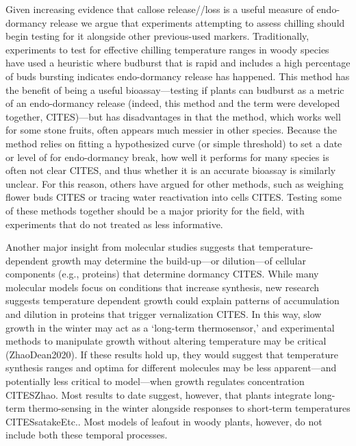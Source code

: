 \documentclass[11pt]{article}
\begin{document}
Given increasing evidence that callose release//loss is a useful measure of endo-dormancy release we argue that experiments attempting to assess chilling should begin testing for it alongside other previous-used markers. Traditionally, experiments to test for effective chilling temperature ranges in woody species have used a heuristic where budburst that is rapid and includes a high percentage of buds bursting indicates endo-dormancy release has happened. This method has the benefit of being a useful bioassay---testing if plants can budburst as a metric of an endo-dormancy release (indeed, this method and the term were developed together, CITES)---but has disadvantages in that the method, which works well for some stone fruits, often appears much messier in other species. Because the method relies on fitting a hypothesized curve (or simple threshold) to set a date or level of for endo-dormancy break, how well it performs for many species is often not clear CITES, and thus whether it is an accurate bioassay is similarly unclear. For this reason, others have argued for other methods, such as weighing flower buds CITES or tracing water reactivation into cells CITES. Testing some of these methods together should be a major priority for the field, with experiments that do not treated as less informative. 

Another major insight from molecular studies suggests that temperature-dependent growth may determine the build-up---or dilution---of cellular components (e.g., proteins) that determine dormancy CITES. While many molecular models focus on conditions that increase synthesis, new research suggests temperature dependent growth could explain patterns of accumulation and dilution in proteins that trigger vernalization CITES. In this way, slow growth in the winter may act as a `long-term thermosensor,' and experimental methods to manipulate growth without altering temperature may be critical (ZhaoDean2020). If these results hold up, they would suggest that temperature synthesis ranges and optima for different molecules may be less apparent---and potentially less critical to model---when growth regulates concentration CITESZhao. Most results to date suggest, however, that plants integrate long-term thermo-sensing in the winter alongside responses to short-term temperatures CITESsatakeEtc.. Most models of leafout in woody plants, however, do not include both these temporal processes. 
\end{document}
